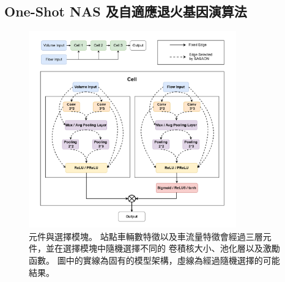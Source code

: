 \documentclass[a4paper,14pt]{extarticle}
\begin{document}
        \subsection{One-Shot NAS 及自適應退火基因演算法}
            
            \begin{figure}[htb]
                \centering
                \includegraphics[width=0.8\textwidth]{cell.pdf}
                \caption{
                    {\fontsize{12pt}{10pt}\selectfont
                        元件與選擇模塊。
                        站點車輛數特徵以及車流量特徵會經過三層元件，並在選擇模塊中隨機選擇不同的
                        卷積核大小、池化層以及激勵函數。
                        圖中的實線為固有的模型架構，虛線為經過隨機選擇的可能結果。
                    }
                }
                \label{fig:cell}
            \end{figure}
\end{document}
